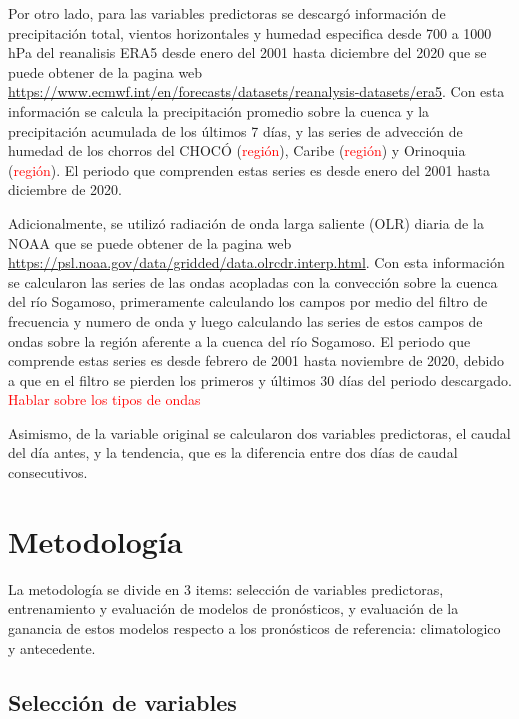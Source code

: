 \documentclass[draft]{agujournal2019}
\begin{document}
Por otro lado, para las variables predictoras se descargó información de precipitación total, vientos horizontales y humedad especifica desde 700 a 1000 hPa del reanalisis ERA5 desde enero del 2001 hasta diciembre del 2020 que se puede obtener de la pagina web \url{https://www.ecmwf.int/en/forecasts/datasets/reanalysis-datasets/era5}. Con esta información se calcula la precipitación promedio sobre la cuenca y la precipitación acumulada de los últimos 7 días, y las series de advección de humedad de los chorros del CHOCÓ (\textcolor{red}{región}), Caribe (\textcolor{red}{región}) y Orinoquia (\textcolor{red}{región}). El periodo que comprenden estas series es desde enero del 2001 hasta diciembre de 2020.

Adicionalmente, se utilizó radiación de onda larga saliente (OLR) diaria de la NOAA que se puede obtener de la pagina web \url{https://psl.noaa.gov/data/gridded/data.olrcdr.interp.html}. Con esta información se calcularon las series de las ondas acopladas con la convección sobre la cuenca del río Sogamoso, primeramente calculando los campos por medio del filtro de frecuencia y numero de onda \cite{Wheeler_And_Kiladis_1999} y luego calculando las series de estos campos de ondas sobre la región aferente a la cuenca del río Sogamoso. El periodo que comprende estas series es desde febrero de 2001 hasta noviembre de 2020, debido a que en el filtro se pierden los primeros y últimos 30 días del periodo descargado. \textcolor{red}{Hablar sobre los tipos de ondas}

Asimismo, de la variable original se calcularon dos variables predictoras, el caudal del día antes, y la tendencia, que es la diferencia entre dos días de caudal consecutivos.

\section{Metodología}

La metodología se divide en 3 items: selección de variables predictoras, entrenamiento y evaluación de modelos de pronósticos, y evaluación de la ganancia de estos modelos respecto a los pronósticos de referencia: climatologico y antecedente.

\subsection{Selección de variables}
\end{document}
